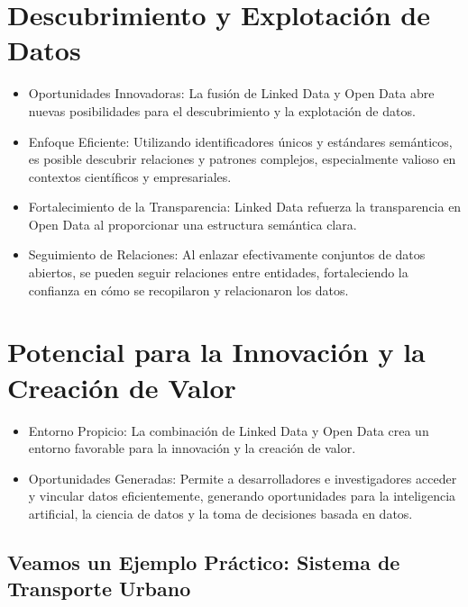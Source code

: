 \documentclass[11pt]{report}
\begin{document}
\section{Descubrimiento y Explotación de Datos}

\begin{itemize}
  \item Oportunidades Innovadoras: La fusión de Linked Data y Open Data abre nuevas posibilidades para el descubrimiento y la explotación de datos.
  \item Enfoque Eficiente: Utilizando identificadores únicos y estándares semánticos, es posible descubrir relaciones y patrones complejos, especialmente valioso en contextos científicos y empresariales.
\end{itemize}


\begin{itemize}
  \item Fortalecimiento de la Transparencia: Linked Data refuerza la transparencia en Open Data al proporcionar una estructura semántica clara.
  \item Seguimiento de Relaciones: Al enlazar efectivamente conjuntos de datos abiertos, se pueden seguir relaciones entre entidades, fortaleciendo la confianza en cómo se recopilaron y relacionaron los datos.
\end{itemize}

\section{Potencial para la Innovación y la Creación de Valor}

\begin{itemize}
  \item Entorno Propicio: La combinación de Linked Data y Open Data crea un entorno favorable para la innovación y la creación de valor.
  \item Oportunidades Generadas: Permite a desarrolladores e investigadores acceder y vincular datos eficientemente, generando oportunidades para la inteligencia artificial, la ciencia de datos y la toma de decisiones basada en datos.
\end{itemize}

\subsection{Veamos un Ejemplo Práctico: Sistema de Transporte Urbano}
\end{document}
